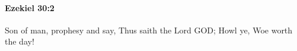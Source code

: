 
		\paragraph{Ezekiel 30:2} %
			\label{EZEKIEL-30-2}

			Son of man, prophesy and say, Thus saith the Lord GOD; Howl ye, Woe worth the day!


